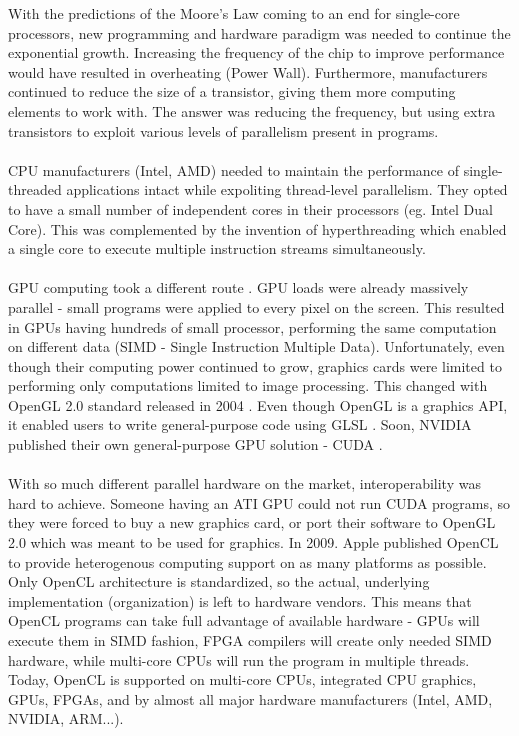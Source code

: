 With the predictions of the Moore's Law \cite{moore1965cramming} coming to an end for single-core processors, new programming and hardware paradigm was needed to continue the exponential growth. Increasing the frequency of the chip to improve performance would have resulted in overheating (Power Wall). Furthermore, manufacturers continued to reduce the size of a transistor, giving them more computing elements to work with. The answer was reducing the frequency, but using extra transistors to exploit various levels of parallelism present in programs.\\
\\
CPU manufacturers (Intel, AMD) needed to maintain the performance of single-threaded applications intact while expoliting thread-level parallelism. They opted to have a small number of independent cores in their processors (eg. Intel Dual Core). This was complemented by the invention of hyperthreading \cite{marr2002hyper} which enabled a single core to execute multiple instruction streams simultaneously.\\
\\
GPU computing took a different route \cite{mcclanahan2010history}. GPU loads were already massively parallel - small programs were applied to every pixel on the screen. This resulted in GPUs having hundreds of small processor, performing the same computation on different data (SIMD - Single Instruction Multiple Data). Unfortunately, even though their computing power continued to grow, graphics cards were limited to performing only computations limited to image processing. This changed with OpenGL 2.0 standard released in 2004 \cite{segal2004opengl}. Even though OpenGL is a graphics API, it enabled users to write general-purpose code using GLSL \cite{kessenich2004opengl}. Soon, NVIDIA published their own general-purpose GPU solution - CUDA \cite{nvidia2007nvidia}.\\
\\
With so much different parallel hardware on the market, interoperability was hard to achieve. Someone having an ATI GPU could not run CUDA programs, so they were forced to buy a new graphics card, or port their software to OpenGL 2.0 which was meant to be used for graphics. In 2009. Apple published OpenCL to provide heterogenous computing support on as many platforms as possible. Only OpenCL architecture is standardized, so the actual, underlying implementation (organization) is left to hardware vendors. This means that OpenCL programs can take full advantage of available hardware - GPUs will execute them in SIMD fashion, FPGA compilers will create only needed SIMD hardware, while multi-core CPUs will run the program in multiple threads. Today, OpenCL is supported on multi-core CPUs, integrated CPU graphics, GPUs, FPGAs, and by almost all major hardware manufacturers (Intel, AMD, NVIDIA, ARM...).


